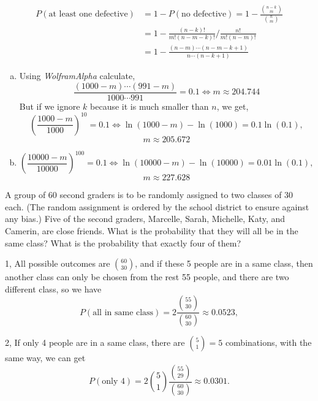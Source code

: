 \documentclass[14pt]{elegantbook}
\begin{document}
    \begin{solution}
        \begin{align*}
            P(\text{at least one defective})&=1-P(\text{no defective})=1-\frac{\binom{n-k}{m}}{\binom{n}{m}}\\
            &=1-\frac{(n-k)!}{m!(n-m-k)!}\big/\frac{n!}{m!(n-m)!}\\
            &=1-\frac{(n-m)\cdots(n-m-k+1)}{n\cdots(n-k+1)}
        \end{align*}
        \begin{enumerate}[(a)]
            \item Using \emph{WolframAlpha} calculate, 
            \[\frac{(1000-m)\cdots(991-m)}{1000\cdots991}=0.1\Leftrightarrow m\approx 204.744 \]
            But if we ignore $k$ because it is much smaller than $n$, we get,
            \[
                \left(\frac{1000-m}{1000}\right)^{10}=0.1\Leftrightarrow \ln(1000-m)-\ln(1000)=0.1\ln(0.1), 
            \]
            \[m\approx 205.672\]
            \item \[
                \left(\frac{10000-m}{10000}\right)^{100}=0.1\Leftrightarrow \ln(10000-m)-\ln(10000)=0.01\ln(0.1), 
            \]
            \[m\approx 227.628\]
        \end{enumerate}
    \end{solution}

    \begin{exercise*}[3]
        A group of $60$ second graders is to be randomly assigned to two classes of $30$ each. (The random assignment is ordered by the school district to ensure against any bias.) Five of the second graders, Marcelle, Sarah, Michelle, Katy, and Camerin, are close friends. What is the probability that they will all be in the same class? What is the probability that exactly four of them? 
    \end{exercise*}

    \begin{solution}

        1, All possible outcomes are $\binom{60}{30}$, and if these 5 people are in a same class, then another class can only be chosen from the rest 55 people, and there are two different class, so we have
        \[
            P(\text{all in same class})=2\frac{\binom{55}{30}}{\binom{60}{30}}\approx 0.0523, 
        \]

        2, If only 4 people are in a same class, there are $\binom{5}{1}=5$ combinations, with the same way, we can get 
        \[
            P(\text{only 4})=2\binom{5}{1}\frac{\binom{55}{29}}{\binom{60}{30}}\approx 0.0301. 
        \]
    \end{solution}
\end{document}
